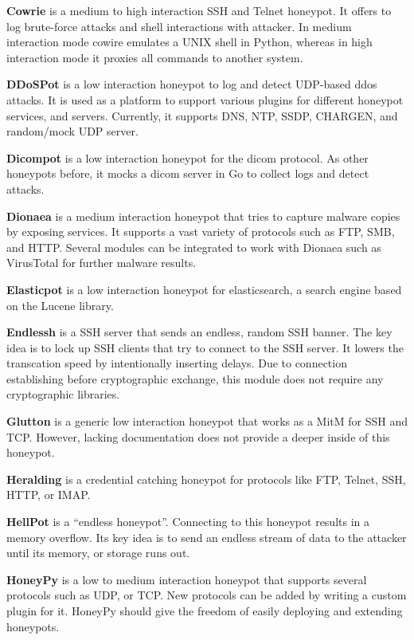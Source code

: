 \textbf{Cowrie} \cite{cowire2021} is a medium to high interaction SSH and Telnet honeypot.
It offers to log brute-force attacks and shell interactions with attacker.
In medium interaction mode cowire emulates a UNIX shell in Python, whereas in high interaction mode it proxies all commands to another system.

\textbf{DDoSPot} \cite{ddosspot2021} is a low interaction honeypot to log and detect UDP-based \ac{ddos} attacks.
It is used as a platform to support various plugins for different honeypot services, and servers.
Currently, it supports DNS, NTP, SSDP, CHARGEN, and random/mock UDP server.

\textbf{Dicompot} \cite{dicompot2021} is a low interaction honeypot for the \ac{dicom} protocol.
As other honeypots before, it mocks a \ac{dicom} server in Go to collect logs and detect attacks.

\textbf{Dionaea} \cite{dionaea2021} is a medium interaction honeypot that tries to capture malware copies by exposing services.
It supports a vast variety of protocols such as FTP, SMB, and HTTP.
Several modules can be integrated to work with Dionaea such as VirusTotal for further malware results.

\textbf{Elasticpot} \cite{elasticpot2021} is a low interaction honeypot for elasticsearch, a search engine based on the Lucene library.

\textbf{Endlessh} \cite{endlessh2021} is a SSH server that sends an endless, random SSH banner.
The key idea is to lock up SSH clients that try to connect to the SSH server.
It lowers the transcation speed by intentionally inserting delays.
Due to connection establishing before cryptographic exchange, this module does not require any cryptographic libraries.

\textbf{Glutton} \cite{glutton2021} is a generic low interaction honeypot that works as a MitM for SSH and TCP.
However, lacking documentation does not provide a deeper inside of this honeypot.

\textbf{Heralding} \cite{heralding2021} is a credential catching honeypot for protocols like FTP, Telnet, SSH, HTTP, or IMAP.

\textbf{HellPot} \cite{hellpot2021} is a \enquote{endless honeypot}.
Connecting to this honeypot results in a memory overflow.
Its key idea is to send an endless stream of data to the attacker until its memory, or storage runs out.

\textbf{HoneyPy} \cite{honeysap2021} is a low to medium interaction honeypot that supports several protocols such as UDP, or TCP.
New protocols can be added by writing a custom plugin for it.
HoneyPy should give the freedom of easily deploying and extending honeypots.

